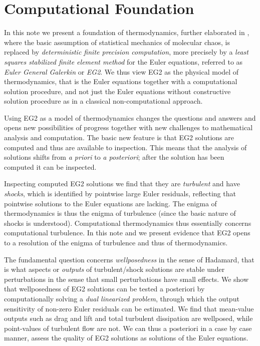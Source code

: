  
\section{Computational Foundation}   

In this note we present a foundation of thermodynamics, further
elaborated in \cite{nazarov2009, hoffjohn2007}, 
where the basic assumption of statistical mechanics of
molecular chaos, is replaced by 
\emph{deterministic finite precision computation}, more precisely by
a \emph{least squares stabilized finite element method} 
for the Euler equations, referred to
as \emph{Euler General Galerkin} or \emph{EG2}.
We thus view EG2 as the 
physical model of thermodynamics, that is the Euler equations
together with a computational solution procedure, and not just
the Euler equations without constructive solution procedure
as in a classical non-computational approach. 

Using EG2 as a model of thermodynamics changes the questions 
and answers and opens new possibilities of progress together with
new challenges to mathematical analysis and computation.
The basic new feature is that EG2 solutions are computed and thus 
are available to inspection. This means that the analysis of solutions 
shifts from \emph{a priori} to \emph{a posteriori}; after the solution
has been computed it can be inspected.

Inspecting computed EG2 solutions we find that they are 
\emph{turbulent} and have \emph{shocks}, which is identified by pointwise
large Euler residuals, reflecting that pointwise solutions
to the Euler equations are lacking. The enigma of thermodynamics
is thus the enigma of turbulence (since the basic nature of shocks is 
understood). Computational thermodynamics thus essentially
concerns computational turbulence. In this note and \cite{hoffjohn2007}
we present evidence that EG2 opens to a resolution 
of the enigma of turbulence and thus of thermodynamics.

 
The fundamental question concerns \emph{wellposedness} in the sense
of Hadamard, that is what aspects or \emph{outputs} of 
turbulent/shock solutions 
are stable under perturbations in the sense that small perturbations
have small effects. We show that wellposedness of EG2 solutions
can be tested a posteriori by computationally solving a \emph{dual linearized
problem}, through which the output sensitivity of non-zero Euler residuals
can be estimated. We find that mean-value outputs such as drag and lift 
and total turbulent dissipation are wellposed, while point-values
of turbulent flow are not. We can thus a posteriori in a case by case 
manner, assess the quality of EG2 solutions as solutions of the Euler 
equations. 


